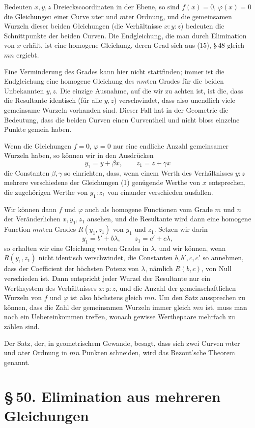 \documentclass[11pt]{article}
\providecommand{\sect}[2]{\section*{\S\,#1. #2}}
\begin{document}
Bedeuten $x,y,z$ Dreieckscoordinaten in der Ebene, so sind $f(x)=0$, $\varphi(x)=0$ die Gleichungen einer Curve $n$ter und $m$ter Ordnung, und die gemeinsamen Wurzeln dieser beiden Gleichungen (die Verhältnisse $x:y:z$) bedeuten die Schnittpunkte der beiden Curven. Die Endgleichung, die man durch Elimination von $x$ erhält, ist eine homogene Gleichung, deren Grad sich aus (15), \S\,48 gleich $mn$ ergiebt.

Eine Verminderung des Grades kann hier nicht stattfinden; immer ist die Endgleichung eine homogene Gleichung des $nm$ten Grades für die beiden Unbekannten $y,z$. Die einzige Ausnahme, auf die wir zu achten ist, ist die, dass die Resultante identisch (für alle $y,z$) verschwindet, dass also unendlich viele gemeinsame Wurzeln vorhanden sind. Dieser Fall hat in der Geometrie die Bedeutung, dass die beiden Curven einen Curventheil und nicht bloss einzelne Punkte gemein haben.

Wenn die Gleichungen $f=0$, $\varphi=0$ nur eine endliche Anzahl gemeinsamer Wurzeln haben, so können wir in den Ausdrücken
\[
y_1=y+\beta x,
\qquad
z_1=z+\gamma x
\]
die Constanten $\beta,\gamma$ so einrichten, dass, wenn einem Werth des Verhältnisses $y:z$ mehrere verschiedene der Gleichungen (1) genügende Werthe von $x$ entsprechen, die zugehörigen Werthe von $y_1:z_1$ von einander verschieden ausfallen.

Wir können dann $f$ und $\varphi$ auch als homogene Functionen vom Grade $m$ und $n$ der Veränderlichen $x,y_1,z_1$ ansehen, und die Resultante wird dann eine homogene Function $mn$ten Grades $R(y_1,z_1)$ von $y_1$ und $z_1$. Setzen wir darin
\[
y_1=b'+b\lambda,
\qquad
z_1=c'+c\lambda,
\]
so erhalten wir eine Gleichung $mn$ten Grades in $\lambda$, und wir können, wenn $R(y_1,z_1)$ nicht identisch verschwindet, die Constanten $b,b',c,c'$ so annehmen, dass der Coefficient der höchsten Potenz von $\lambda$, nämlich $R(b,c)$, von Null verschieden ist. Dann entspricht jeder Wurzel der Resultante nur ein Werthsystem des Verhältnisses $x:y:z$, und die Anzahl der gemeinschaftlichen Wurzeln von $f$ und $\varphi$ ist also höchstens gleich $mn$. Um den Satz aussprechen zu können, dass die Zahl der gemeinsamen Wurzeln immer gleich $mn$ ist, muss man noch ein Uebereinkommen treffen, wonach gewisse Werthepaare mehrfach zu zählen sind.

Der Satz, der, in geometrischem Gewande, besagt, dass sich zwei Curven $m$ter und $n$ter Ordnung in $mn$ Punkten schneiden, wird das Bezout'sche Theorem genannt.

\sect{50}{Elimination aus mehreren Gleichungen}
\end{document}
